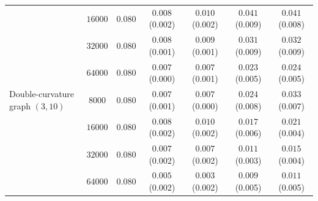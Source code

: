 \begin{tabular}{lcccccc}
 & $16000$ & $0.080$ & $0.008$ \scriptsize(0.002) & $0.010$ \scriptsize(0.002) & $0.041$ \scriptsize(0.009) & $0.041$ \scriptsize(0.008) \\
 & $32000$ & $0.080$ & $0.008$ \scriptsize(0.001) & $0.009$ \scriptsize(0.001) & $0.031$ \scriptsize(0.009) & $0.032$ \scriptsize(0.009) \\
 & $64000$ & $0.080$ & $0.007$ \scriptsize(0.000) & $0.007$ \scriptsize(0.001) & $0.023$ \scriptsize(0.005) & $0.024$ \scriptsize(0.005) \\
\midrule
Double-curvature graph $(3,10)$ & $8000$ & $0.080$ & $0.007$ \scriptsize(0.001) & $0.007$ \scriptsize(0.000) & $0.024$ \scriptsize(0.008) & $0.033$ \scriptsize(0.007) \\
 & $16000$ & $0.080$ & $0.008$ \scriptsize(0.002) & $0.010$ \scriptsize(0.002) & $0.017$ \scriptsize(0.006) & $0.021$ \scriptsize(0.004) \\
 & $32000$ & $0.080$ & $0.007$ \scriptsize(0.002) & $0.007$ \scriptsize(0.002) & $0.011$ \scriptsize(0.003) & $0.015$ \scriptsize(0.004) \\
 & $64000$ & $0.080$ & $0.005$ \scriptsize(0.002) & $0.003$ \scriptsize(0.002) & $0.009$ \scriptsize(0.005) & $0.011$ \scriptsize(0.005) \\
\bottomrule
\end{tabular}
